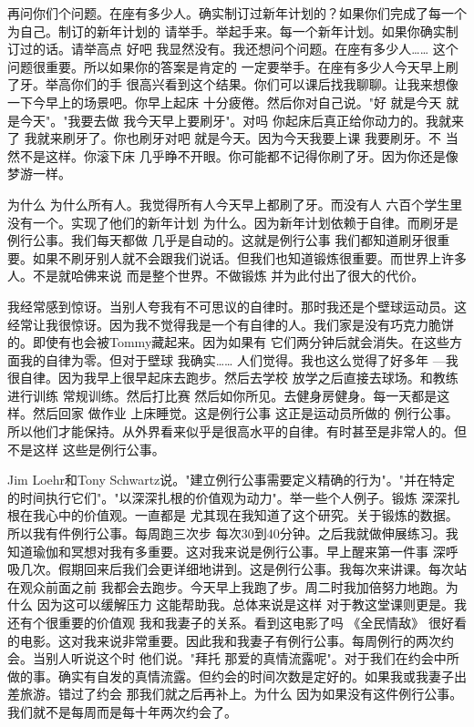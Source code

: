 再问你们个问题。在座有多少人。确实制订过新年计划的？如果你们完成了每一个为自己。制订的新年计划的 请举手。举起手来。每一个新年计划。如果你确实制订过的话。请举高点 好吧 我显然没有。我还想问个问题。在座有多少人…… 这个问题很重要。所以如果你的答案是肯定的 一定要举手。在座有多少人今天早上刷了牙。举高你们的手 很高兴看到这个结果。你们可以课后找我聊聊。让我来想像一下今早上的场景吧。你早上起床 十分疲倦。然后你对自己说。"好 就是今天 就是今天"。"我要去做 我今天早上要刷牙"。对吗 你起床后真正给你动力的。我就来了 我就来刷牙了。你也刷牙对吧 就是今天。因为今天我要上课 我要刷牙。不 当然不是这样。你滚下床 几乎睁不开眼。你可能都不记得你刷了牙。因为你还是像梦游一样。 

为什么 为什么所有人。我觉得所有人今天早上都刷了牙。而没有人 六百个学生里没有一个。实现了他们的新年计划 为什么。因为新年计划依赖于自律。而刷牙是例行公事。我们每天都做 几乎是自动的。这就是例行公事 我们都知道刷牙很重要。如果不刷牙别人就不会跟我们说话。但我们也知道锻炼很重要。而世界上许多人。不是就哈佛来说 而是整个世界。不做锻炼 并为此付出了很大的代价。 

我经常感到惊讶。当别人夸我有不可思议的自律时。那时我还是个壁球运动员。这经常让我很惊讶。因为我不觉得我是一个有自律的人。我们家是没有巧克力脆饼的。即使有也会被Tommy藏起来。因为如果有 它们两分钟后就会消失。在这些方面我的自律为零。但对于壁球 我确实…… 人们觉得。我也这么觉得了好多年 ---我很自律。因为我早上很早起床去跑步。然后去学校 放学之后直接去球场。和教练进行训练 常规训练。然后打比赛 然后如你所见。去健身房健身。每一天都是这样。然后回家 做作业 上床睡觉。这是例行公事 这正是运动员所做的 例行公事。所以他们才能保持。从外界看来似乎是很高水平的自律。有时甚至是非常人的。但不是这样 这些是例行公事。 

Jim Loehr和Tony Schwartz说。"建立例行公事需要定义精确的行为"。"并在特定的时间执行它们"。"以深深扎根的价值观为动力"。举一些个人例子。锻炼 深深扎根在我心中的价值观。一直都是 尤其现在我知道了这个研究。关于锻炼的数据。所以我有件例行公事。每周跑三次步 每次30到40分钟。之后我就做伸展练习。我知道瑜伽和冥想对我有多重要。这对我来说是例行公事。早上醒来第一件事 深呼吸几次。假期回来后我们会更详细地讲到。这是例行公事。我每次来讲课。每次站在观众前面之前 我都会去跑步。今天早上我跑了步。周二时我加倍努力地跑。为什么 因为这可以缓解压力 这能帮助我。总体来说是这样 对于教这堂课则更是。我还有个很重要的价值观 我和我妻子的关系。看到这电影了吗 《全民情敌》 很好看的电影。这对我来说非常重要。因此我和我妻子有例行公事。每周例行的两次约会。当别人听说这个时 他们说。"拜托 那爱的真情流露呢"。对于我们在约会中所做的事。确实有自发的真情流露。但约会的时间次数是定好的。如果我或我妻子出差旅游。错过了约会 那我们就之后再补上。为什么 因为如果没有这件例行公事。我们就不是每周而是每十年两次约会了。 

